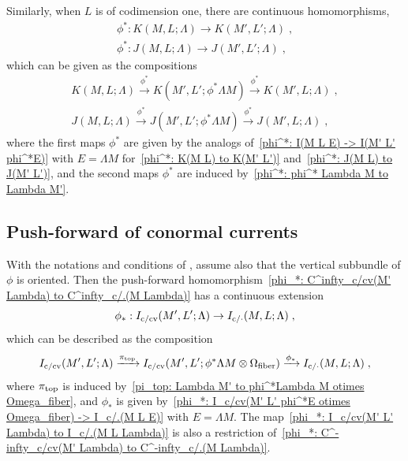 \documentclass{memo-l}
\theoremstyle{plain}
\theoremstyle{definition}
\theoremstyle{remark}
\newcommand{\fiber}{{\text{\rm fiber}}}
\newcommand{\topd}{{\text{\rm top}}}
\newcommand{\co}{{\text{\rm c}}}
\newcommand{\cv}{{\text{\rm cv}}}
\numberwithin{section}{chapter}
\numberwithin{equation}{section}%
\begin{document}
Similarly, when $L$ is of codimension one, there are continuous homomorphisms,
\begin{gather}
\phi^*:K(M,L;\Lambda)\to K(M',L';\Lambda)\;,\label{phi^*: K(M L Lambda) to K(M' L' Lambda)}\\
\phi^*:J(M,L;\Lambda)\to J(M',L';\Lambda)\;,\label{phi^*: J(M L Lambda) to J(M' L' Lambda)}
\end{gather}
which can be given as the compositions
\begin{gather}
K(M,L;\Lambda)\xrightarrow{\phi^*}K(M',L';\phi^*\Lambda M)\xrightarrow{\phi^*}K(M',L;\Lambda)\;,
\label{composition - pull-back - K-currents}\\
J(M,L;\Lambda)\xrightarrow{\phi^*}J(M',L';\phi^*\Lambda M)\xrightarrow{\phi^*}J(M',L;\Lambda)\;,
\label{composition - pull-back - J-currents}
\end{gather}
where the first maps $\phi^*$ are given by the analogs of~\eqref{phi^*: I(M L E) -> I(M' L' phi^*E)} with $E=\Lambda M$ for~\eqref{phi^*: K(M L) to K(M' L')} and~\eqref{phi^*: J(M L) to J(M' L')}, and the second maps $\phi^*$ are induced by~\eqref{phi^*: phi^* Lambda M to Lambda M'}.



\subsection{Push-forward of conormal currents}\label{ss: push-forward of conormal currents}

With the notations and conditions of , assume also that the vertical subbundle of $\phi$ is oriented. Then the push-forward homomorphism~\eqref{phi_*: C^infty_c/cv(M' Lambda) to C^infty_c/.(M Lambda)} has a continuous extension
\begin{equation}\label{phi_*: I_c/cv(M' L' Lambda) to I_c/.(M L Lambda)}
\phi_*:I_{\co/\cv}(M',L';\Lambda)\to I_{\co/{\cdot}}(M,L;\Lambda)\;,
\end{equation}
which can be described as the composition
\begin{equation}\label{composition - push-forward - conormal currents}
I_{\co/\cv}(M',L';\Lambda)\xrightarrow{\pi_\topd}I_{\co/\cv}(M',L';\phi^*\Lambda M\otimes\Omega_\fiber)
\xrightarrow{\phi_*}I_{\co/{\cdot}}(M,L;\Lambda)\;,
\end{equation}
where $\pi_\topd$ is induced by~\eqref{pi_top: Lambda M' to phi^*Lambda M otimes Omega_fiber}, and $\phi_*$ is given by~\eqref{phi_*: I_c/cv(M' L' phi^*E otimes Omega_fiber) -> I_c/.(M L E)} with $E=\Lambda M$. The map~\eqref{phi_*: I_c/cv(M' L' Lambda) to I_c/.(M L Lambda)} is also a restriction of~\eqref{phi_*: C^-infty_c/cv(M' Lambda) to C^-infty_c/.(M Lambda)}.
\end{document}
